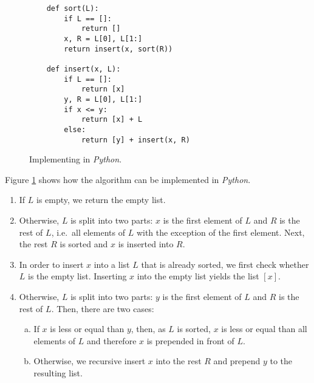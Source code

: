 \begin{figure}[!ht]
  \centering
\begin{verbatim}
    def sort(L):
        if L == []:
            return []
        x, R = L[0], L[1:]
        return insert(x, sort(R))
    
    def insert(x, L):
        if L == []:
            return [x]
        y, R = L[0], L[1:]
        if x <= y:
            return [x] + L
        else:
            return [y] + insert(x, R)
\end{verbatim}
\vspace*{-0.3cm}
  \caption{Implementing  in \textsl{Python}.}
  \label{fig:Insertion-Sort.ipynb}
\end{figure} 

\noindent
Figure \ref{fig:Insertion-Sort.ipynb} shows how the  algorithm can be implemented 
in \textsl{Python}.
\begin{enumerate}
\item If $L$ is empty, we return the empty list.
\item Otherwise, $L$ is split into two parts: $x$ is the first element of $L$ and $R$ is the rest of $L$,
      i.e.~all elements of $L$ with the exception of the first element.  Next, the rest $R$ is sorted and $x$
      is inserted into $R$.
\item In order to insert $x$ into a list $L$ that is already sorted, we first check whether $L$ is the
      empty list.  Inserting $x$ into the empty list yields the list $[x]$.
\item Otherwise, $L$ is split into two parts: $y$ is the first element of $L$ and $R$ is the rest of $L$.
      Then, there are two cases:
      \begin{enumerate}[(a)]
      \item If $x$ is less or equal than $y$, then, as $L$ is sorted,  $x$ is less or equal than all elements
            of $L$ and therefore $x$ is prepended in front of $L$.
      \item Otherwise, we recursive insert $x$ into the rest $R$ and prepend $y$ to the resulting list.
        
      \end{enumerate}
\end{enumerate}

